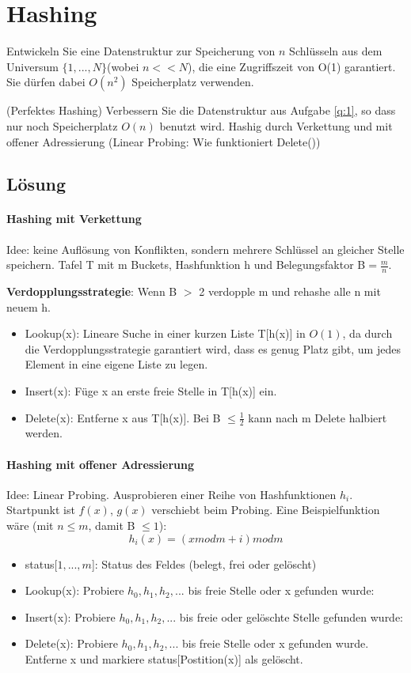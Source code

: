 \section{Hashing}
	Entwickeln Sie eine Datenstruktur zur Speicherung von $n$ Schlüsseln aus dem Universum $\{1,...,N\}$(wobei $n<<N$), die eine Zugriffszeit von O(1) garantiert. Sie dürfen dabei $O(n^2)$ Speicherplatz verwenden.
	
(Perfektes Hashing) Verbessern Sie die Datenstruktur aus Aufgabe \ref{q:1}, so dass nur noch Speicherplatz $O(n)$ benutzt wird.
Hashig durch Verkettung und mit offener Adressierung (Linear Probing: Wie funktioniert Delete())

\subsection*{Lösung}
\paragraph{Hashing mit Verkettung} Idee: keine Auflösung von Konflikten, sondern mehrere Schlüssel an gleicher Stelle speichern. Tafel T mit m Buckets, Hashfunktion h und Belegungsfaktor B$ =\frac{m}{n} $.

\textbf{Verdopplungsstrategie}: Wenn B $ > $ 2 verdopple m und rehashe alle n mit neuem h.
\begin{itemize}
    \item[] Lookup(x): Lineare Suche in einer kurzen Liste T[h(x)] in $O(1)$, da durch die Verdopplungsstrategie garantiert wird, dass es genug Platz gibt, um jedes Element in eine eigene Liste zu legen.
    \item[] Insert(x): Füge x an erste freie Stelle in T[h(x)] ein.
    \item[] Delete(x): Entferne x aus T[h(x)]. Bei B $\leq \frac{1}{2}$ kann nach m Delete halbiert werden.
\end{itemize}

\paragraph{Hashing mit offener Adressierung} Idee: Linear Probing. Ausprobieren einer Reihe von Hashfunktionen $ h_i $. Startpunkt ist $ f(x) $, $ g(x) $ verschiebt beim Probing. Eine Beispielfunktion wäre (mit $n\leq m$, damit B $ \leq 1 $):
\[ h_i(x) = (x modm + i)modm \]

\begin{itemize}
    \item[] status[$1,...,m$]: Status des Feldes (belegt, frei oder gelöscht)
    \item[] Lookup(x): Probiere $ h_0, h_1, h_2,... $ bis freie Stelle oder x gefunden wurde:
    \item[] Insert(x): Probiere $ h_0, h_1, h_2,... $ bis freie oder gelöschte Stelle gefunden wurde:
    \item[] Delete(x): Probiere $ h_0, h_1, h_2,... $ bis freie Stelle oder x gefunden wurde. Entferne x und markiere status[Postition(x)] als gelöscht.
\end{itemize}


